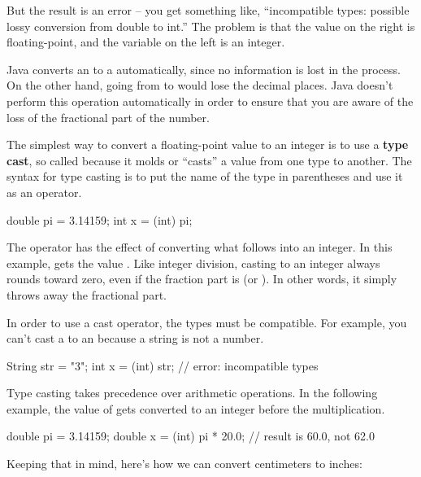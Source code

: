 But the result is an error -- you get something like, ``incompatible types: possible lossy conversion from double to int.''
The problem is that the value on the right is floating-point, and the variable on the left is an integer.

Java converts an  to a  automatically, since no information is lost in the process.
On the other hand, going from  to  would lose the decimal places.
Java doesn't perform this operation automatically in order to ensure that you are aware of the loss of the fractional part of the number.


The simplest way to convert a floating-point value to an integer is to use a {\bf type cast}, so called because it molds or ``casts'' a value from one type to another.
The syntax for type casting is to put the name of the type in parentheses and use it as an operator.

\begin{code}
double pi = 3.14159;
int x = (int) pi;
\end{code}

The  operator has the effect of converting what follows into an integer.
In this example,  gets the value .
Like integer division, casting to an integer always rounds toward zero, even if the fraction part is  (or ).
In other words, it simply throws away the fractional part.

In order to use a cast operator, the types must be compatible.
For example, you can't cast a  to an  because a string is not a number.

\begin{code}
String str = "3";
int x = (int) str;  // error: incompatible types
\end{code}

Type casting takes precedence over arithmetic operations.
In the following example, the value of  gets converted to an integer before the multiplication.

\begin{code}
double pi = 3.14159;
double x = (int) pi * 20.0;  // result is 60.0, not 62.0
\end{code}


Keeping that in mind, here's how we can convert centimeters to inches:

